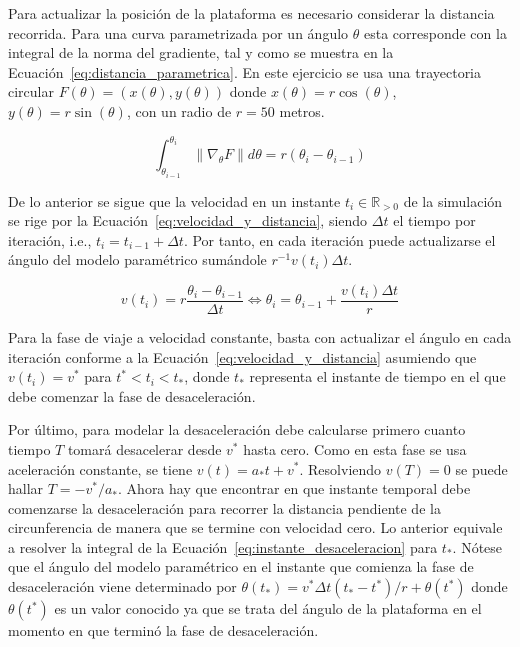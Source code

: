 \documentclass[]{article}
\begin{document}
	Para actualizar la posición de la plataforma es necesario considerar la distancia recorrida. Para una curva parametrizada por un ángulo $\theta$ esta corresponde con la integral de la norma del gradiente, tal y como se muestra en la Ecuación~\ref{eq:distancia_parametrica}. En este ejercicio se usa una trayectoria circular $F(\theta) = (x(\theta), y(\theta))$ donde $x(\theta)=r \cos(\theta)$, $y(\theta) = r \sin(\theta)$, con un radio de $r=50$ metros.
	
	\begin{equation}
		\int_{\theta_{i-1}}^{\theta_{i}} \lVert\nabla_{\theta} F\rVert d\theta = r(\theta_i - \theta_{i-1})
	\label{eq:distancia_parametrica}
	\end{equation}

	De lo anterior se sigue que la velocidad en un instante $t_i \in \mathbb{R}_{>0}$ de la simulación se rige por la Ecuación~\ref{eq:velocidad_y_distancia}, siendo $\Delta t$ el tiempo por iteración, i.e., $t_{i} = t_{i-1} + \Delta t$. Por tanto, en cada iteración puede actualizarse el ángulo del modelo paramétrico sumándole $r^{-1}v(t_i)\Delta t$.
	
	\begin{equation}
		v(t_i) = r \dfrac{\theta_{i} - \theta_{i-1}}{\Delta t} \iff \theta_i = \theta_{i-1} + \dfrac{v(t_i)\Delta t}{r}
	\label{eq:velocidad_y_distancia}		
	\end{equation}
	
	Para la fase de viaje a velocidad constante, basta con actualizar el ángulo en cada iteración conforme a la Ecuación~\ref{eq:velocidad_y_distancia} asumiendo que $v(t_i) = v^*$ para $t^* < t_i < t_*$, donde $t_*$ representa el instante de tiempo en el que debe comenzar la fase de desaceleración.
	
	Por último, para modelar la desaceleración debe calcularse primero cuanto tiempo $T$ tomará desacelerar desde $v^*$ hasta cero. Como en esta fase se usa aceleración constante, se tiene $v(t) = a_*t+v^*$. Resolviendo $v(T)=0$ se puede hallar $T=-v^*/a_*$. Ahora hay que encontrar en que instante temporal debe comenzarse la desaceleración para recorrer la distancia pendiente de la circunferencia de manera que se termine con velocidad cero. Lo anterior equivale a resolver la integral de la Ecuación~\ref{eq:instante_desaceleracion} para $t_*$. Nótese que el ángulo del modelo paramétrico en el instante que comienza la fase de desaceleración viene determinado por $\theta(t_*) =  v^* \Delta{t} (t_* - t^*)/r + \theta(t^*)$ donde $\theta(t^*)$ es un valor conocido ya que se trata del ángulo de la plataforma en el momento en que terminó la fase de desaceleración.
	
\end{document}
